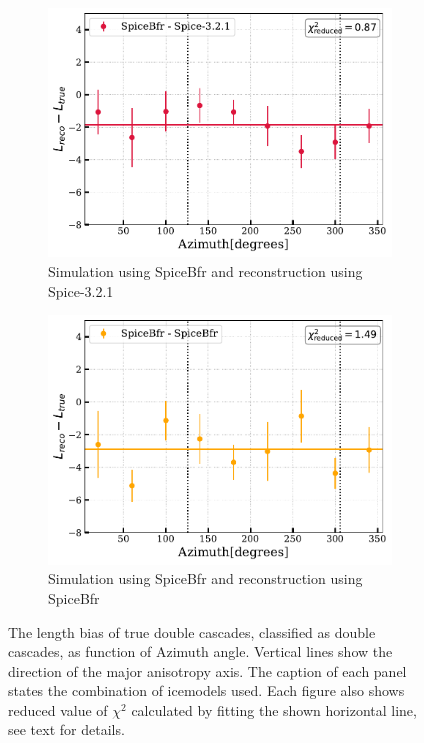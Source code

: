 \begin{figure}[hbt!]
\medskip %
\begin{subfigure}{.7\textwidth}
    \includegraphics[width=\linewidth]{./figures/EventSample/Lbias_bfrspice.pdf}
    \caption{Simulation using SpiceBfr and reconstruction using Spice-3.2.1}
\end{subfigure}\hfill %
\begin{subfigure}{.7\textwidth}
    \includegraphics[width=\linewidth]{./figures/EventSample/Lbias_bfrbfr.pdf}
    \caption{Simulation using SpiceBfr and reconstruction using SpiceBfr}
\end{subfigure}

\caption{The length bias of true double cascades, classified as double cascades, as function of Azimuth angle. Vertical lines show the direction of the major anisotropy axis. The caption of each panel states the combination of icemodels used. Each figure also shows reduced value of $\chi^2$ calculated by fitting the shown horizontal line, see text for details.}
\end{figure}


